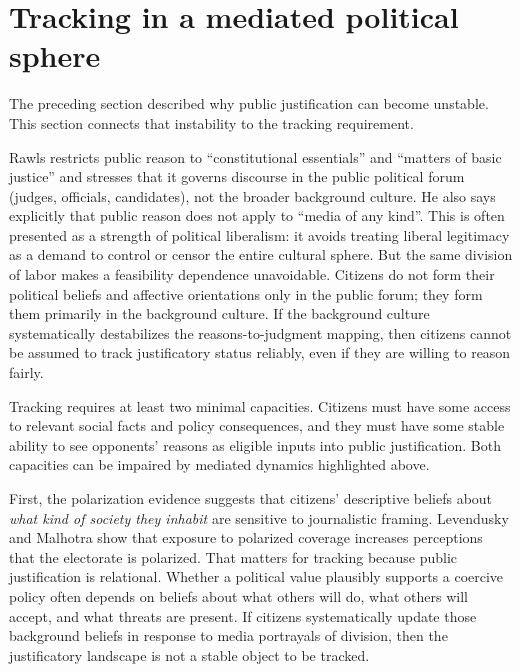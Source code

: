 \documentclass[12pt]{report}
\begin{document}
\section{Tracking in a mediated political sphere}\label{sec:ch5-tracking-mediated}

The preceding section described why public justification can become unstable. This section connects that instability to the tracking requirement.

Rawls restricts public reason to \enquote{constitutional essentials} and \enquote{matters of basic justice} and stresses that it governs discourse in the public political forum (judges, officials, candidates), not the broader background culture.\parencite[p.~767]{rawls1997public} He also says explicitly that public reason does not apply to \enquote{media of any kind}.\parencite[p.~768]{rawls1997public} This is often presented as a strength of political liberalism: it avoids treating liberal legitimacy as a demand to control or censor the entire cultural sphere. But the same division of labor makes a feasibility dependence unavoidable. Citizens do not form their political beliefs and affective orientations only in the public forum; they form them primarily in the background culture. If the background culture systematically destabilizes the reasons-to-judgment mapping, then citizens cannot be assumed to track justificatory status reliably, even if they are willing to reason fairly.

Tracking requires at least two minimal capacities. Citizens must have some access to relevant social facts and policy consequences, and they must have some stable ability to see opponents’ reasons as eligible inputs into public justification. Both capacities can be impaired by mediated dynamics highlighted above.

First, the polarization evidence suggests that citizens’ descriptive beliefs about \emph{what kind of society they inhabit} are sensitive to journalistic framing. Levendusky and Malhotra show that exposure to polarized coverage increases perceptions that the electorate is polarized.\parencite[p.~290]{levenduskyMalhotra2016polarization} That matters for tracking because public justification is relational. Whether a political value plausibly supports a coercive policy often depends on beliefs about what others will do, what others will accept, and what threats are present. If citizens systematically update those background beliefs in response to media portrayals of division, then the justificatory landscape is not a stable object to be tracked.
\end{document}
